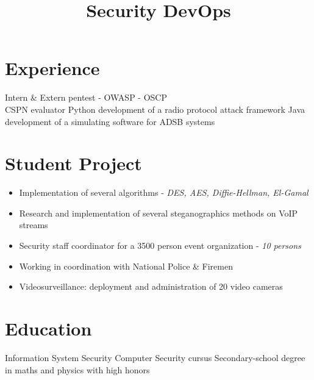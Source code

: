 \documentclass[11pt,a4paper,francais]{moderncv}
\title{Security DevOps}
\begin{document}
\maketitle
\vspace*{-3\baselineskip}

\section{Experience}
{Intern \& Extern pentest - OWASP - OSCP\\
CSPN evaluator}
{Python development of a radio protocol attack framework}
{Java development of a simulating software for ADSB systems}

\section{Student Project}
{
\begin{itemize}
 \item Implementation of several algorithms - \textit{DES, AES, Diffie-Hellman, El-Gamal}
 \item Research and implementation of several steganographics methods on VoIP streams
\end{itemize}
}
{
\begin{itemize}
  \item Security staff coordinator for a 3500 person event organization - \textit{10 persons}
  \item Working in coordination with National Police \& Firemen 
  \item Videosurveillance: deployment and administration of 20 video cameras
\end{itemize}
}

\section{Education}
{Information System Security}
{Computer Security cursus}
{Secondary-school degree in maths and physics with high honors}
\end{document}
